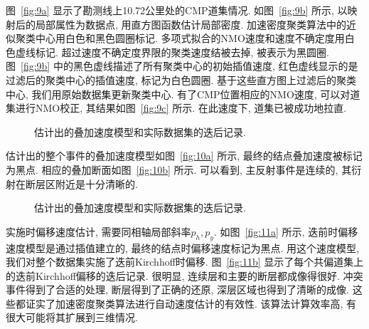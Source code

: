 图~\ref{fig:9a} 显示了勘测线上10.72公里处的CMP道集情况. 如图~\ref{fig:9b} 所示, 以映射后的局部属性为数据点, 用直方图函数估计局部密度. 加速密度聚类算法中的近似聚类中心用白色和黑色圆圈标记. 多项式拟合的NMO速度和速度不确定度用白色虚线标记. 超过速度不确定度界限的聚类速度结被去掉, 被表示为黑圆圈. 图~\ref{fig:9b} 中的黑色虚线描述了所有聚类中心的初始插值速度, 红色虚线显示的是过滤后的聚类中心的插值速度, 标记为白色圆圈. 基于这些直方图上过滤后的聚类中心, 我们用原始数据集更新聚类中心. 有了CMP位置相应的NMO速度, 可以对道集进行NMO校正, 其结果如图~\ref{fig:9c} 所示. 在此速度下, 道集已被成功地拉直. 
\begin{figure}[htb]
    \centering
    \caption{估计出的叠加速度模型和实际数据集的迭后记录. \label{fig:10}}
\end{figure}
估计出的整个事件的叠加速度模型如图~\ref{fig:10a} 所示, 最终的结点叠加速度被标记为黑点. 相应的叠加断面如图~\ref{fig:10b} 所示. 可以看到, 主反射事件是连续的, 其衍射在断层区附近是十分清晰的. 
\begin{figure}[htb]
    \centering
    \caption{估计出的叠加速度模型和实际数据集的迭后记录. \label{fig:11}}
\end{figure}

实施时偏移速度估计, 需要同相轴局部斜率$p_h, p_y$. 如图~\ref{fig:11a} 所示, 迭前时偏移速度模型是通过插值建立的, 最终的结点时偏移速度标记为黑点. 用这个速度模型, 我们对整个数据集实施了迭前Kirchhoff时偏移. 图~\ref{fig:11b} 显示了每个共偏道集上的迭前Kirchhoff偏移的迭后记录. 很明显, 连续层和主要的断层都成像得很好. 冲突事件得到了合适的处理, 断层得到了正确的还原, 深层区域也得到了清晰的成像. 这些都证实了加速密度聚类算法进行自动速度估计的有效性. 该算法计算效率高, 有很大可能将其扩展到三维情况. 



